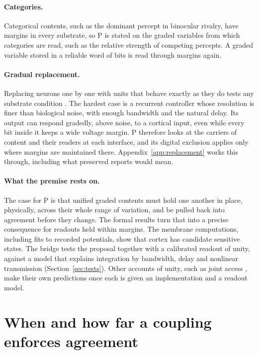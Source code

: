 \documentclass[12pt]{article}
\begin{document}
\paragraph{Categories.} Categorical contents, such as the dominant percept in
binocular rivalry, have margins in every substrate, so P is stated on the graded
variables from which categories are read, such as the relative strength of
competing percepts. A graded variable stored in a reliable word of bits is read
through margins again.

\paragraph{Gradual replacement.} Replacing neurons one by one with units that
behave exactly as they do tests any substrate condition
\citep{chalmers1995}. The hardest case is a recurrent controller whose
resolution is finer than biological noise, with enough bandwidth and the
natural delay. Its output can respond gradedly, above noise, to a cortical
input, even while every bit inside it keeps a wide voltage margin. P therefore
looks at the carriers of content and their readers at each interface, and its
digital exclusion applies only where margins are maintained there.
Appendix~\ref{app:replacement} works this through, including what preserved
reports would mean.

\paragraph{What the premise rests on.} The case for P is that unified graded
contents must hold one another in place, physically, across their whole range
of variation, and be pulled back into agreement before they change. The formal
results turn that into a precise consequence for readouts held within margins.
The membrane computations, including fits to recorded potentials, show that
cortex has candidate sensitive states. The bridge tests the proposal together
with a calibrated readout of unity, against a model that explains integration
by bandwidth, delay and nonlinear transmission (Section~\ref{sec:tests}). Other
accounts of unity, such as joint access \citep{bayne2010}, make their own
predictions once each is given an implementation and a readout model.

\section{When and how far a coupling enforces agreement}
\label{sec:reach}
\end{document}
